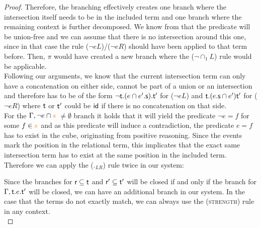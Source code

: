 \documentclass[a4paper,twoside,12pt, english]{article}
\begin{document}
\begin{proof}
Therefore, the branching effectively creates one branch where the intersection itself needs to be in the included term and one branch where the remaining context is further decomposed.
We know from  that the predicate will be union-free and we can assume that there is no intersection around this one, since in that case the rule ($\neg eL$)/($\neg eR$) should have been applied to that term before. Then, $\pi$ would have created a new branch where the ($\neg {\cap_1} L$) rule would be applicable. \\
Following our arguments, we know that the current intersection term can only have a concatenation on either side, cannot be part of a union or an intersection and therefore has to be of the form $\neg \textsf{\upshape t}.(e \cap e'.\textsf{\upshape s}).\textsf{\upshape t}'$ for ($\neg eL$) and $\textsf{\upshape t}.(e.\textsf{\upshape s} \cap e')\textsf{\upshape t}'$ for ($\neg eR$) where $\textsf{\upshape t}$ or $\textsf{\upshape t}'$ could be $\textsf{\upshape id}$ if there is no concatenation on that side. \\
For the $\Gamma, \neg e \cap \color{orange}{s}$ $ \neq \emptyset$ branch it holds that it will yield the predicate $\neg e = f$ for some $f \in \color{orange}{s}$ and as this predicate will induce a contradiction, the predicate $e = f$ has to exist in the cube, originating from positive reasoning. Since the events mark the position in the relational term, this implicates that the exact same intersection term has to exist at the same position in the included term.\\
Therefore we can apply the ($._{LR}$) rule twice in our system:
\begin{mathpar}
\end{mathpar}
Since the branches for $\textsf{\upshape r} \subseteq \textsf{\upshape t}$ and $\textsf{\upshape r}'\subseteq \textsf{\upshape t}'$ will be closed if and only if the branch for $\Gamma, \textsf{\upshape t}.e.\textsf{\upshape t}'$ will be closed, we can have an additional branch in our system. In the case that the terms do not exactly match, we can always use the (\textsc{strength}) rule in any context. \\


\end{proof}
\end{document}
